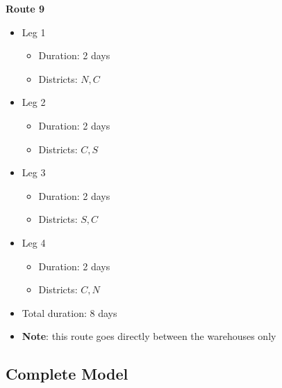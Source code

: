 \documentclass[10pt]{article}
\begin{document}
\begin{minipage}[t]{0.3\textwidth}
    \textbf{Route 9}
    \begin{itemize}
        \item Leg 1
        \begin{itemize}
            \item Duration: 2 days 
            \item Districts: $N, C $
        \end{itemize}
        \item Leg 2
        \begin{itemize}
            \item Duration: 2 days 
            \item Districts: $C, S $
        \end{itemize}
        \item Leg 3
        \begin{itemize}
            \item Duration: 2 days 
            \item Districts: $S, C $
        \end{itemize}
        \item Leg 4
        \begin{itemize}
            \item Duration: 2 days 
            \item Districts: $C, N $
        \end{itemize}
        \item Total duration: 8 days
        \item \textbf{Note}: this route goes directly between the warehouses only 
    \end{itemize}
\end{minipage}
\newpage 

\subsection{Complete Model}
\end{document}

